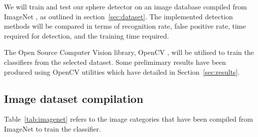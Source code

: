 \documentclass[11pt]{scrartcl}
\begin{document}
{		We will train and test our sphere detector on an image
        database compiled from ImageNet \citep{imagenet_cvpr09}, as outlined in 
        section~\ref{sec:dataset}. The implemented detection methods will be 
        compared in terms of recognition rate, false positive rate, time 
        required for detection, and the training time required.

        The Open Source Computer Vision library, OpenCV \citep{opencv_library},
        will be utilised to train the classifiers from the selected dataset. 
        Some prelimimary results have been produced using OpenCV utilities 
        which have detailed in Section~\ref{sec:results}.

        \subsection{Image dataset compilation} {
        \label{sec:dataset}

            Table~\ref{tab:imagenet} refers to the image categories that have been
            compiled from ImageNet to train the classifier.

}}
\end{document}
